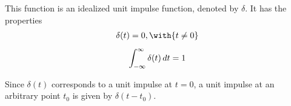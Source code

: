 \label{a2fd0bb}

This function is an idealized unit impulse function, denoted by $\delta$. It
has the properties
\begin{gather*}
  \delta(t)=0,\with{t\neq0}\\[0.5em]
  \int_{-\infty}^\infty\delta(t)\,dt=1
\end{gather*}

Since $\delta(t)$ corresponds to a unit impulse at $t=0$, a unit impulse at an
arbitrary point $t_0$ is given by $\delta(t-t_0)$.

%
%
%
%
%
%
%
%
%
%
